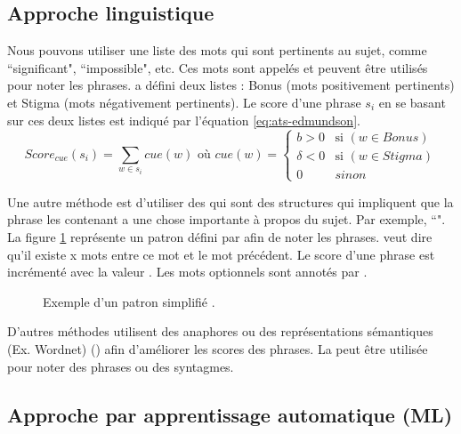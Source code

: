 \documentclass{KodeBook}
\begin{document}
\subsection{Approche linguistique}

Nous pouvons utiliser une liste des mots qui sont pertinents au sujet, comme ``significant", ``impossible", etc. 
Ces mots sont appelés  et peuvent être utilisés pour noter les phrases. 
\citet{69-edmundson} a défini deux listes : Bonus (mots positivement pertinents) et Stigma (mots négativement pertinents).
Le score d'une phrase $s_i$ en se basant sur ces deux listes est indiqué par l'équation \ref{eq:ats-edmundson}.
\begin{equation}\label{eq:ats-edmundson}
Score_{cue}(s_i) = \sum_{w \in s_i}{cue(w)}
\text{ où }
cue(w) = \left\lbrace 
\begin{array}{ll}
b > 0 & \text{si } (w \in Bonus) \\
\delta < 0 & \text{si } (w \in Stigma) \\
0 & sinon 
\end{array} 
\right. 
\end{equation}

Une autre méthode est d'utiliser des  qui sont des structures qui impliquent que la phrase les contenant a une chose importante à propos du sujet.
Par exemple, ``". 
La figure \ref{fig:paice-template} représente un patron défini par \citet{81-paice} afin de noter les phrases. 
\keyword{[x]} veut dire qu'il existe x mots entre ce mot et le mot précédent. 
Le score d'une phrase est incrémenté avec la valeur .
Les mots optionnels sont annotés par .

\begin{figure}[!ht]
	\centering
	\caption[Exemple d'un patron simplifié (résumé automatique)]{Exemple d'un patron simplifié \cite{81-paice}.}
	\label{fig:paice-template}
\end{figure}

D'autres méthodes utilisent des anaphores ou des représentations sémantiques (Ex. Wordnet) () afin d'améliorer les scores des phrases. 
La  peut être utilisée pour noter des phrases ou des syntagmes.


\subsection{Approche par apprentissage automatique (ML)}
\end{document}
